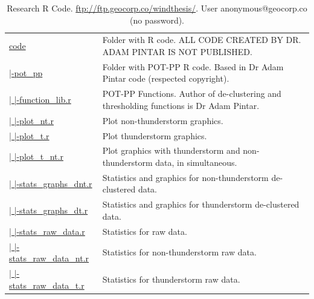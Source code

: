 \documentclass[12pt,twoside]{reedthesis}
\begin{document}
\begingroup\fontsize{7}{9}\selectfont
\begin{longtable}[t]{>{\raggedright\arraybackslash}p{1.3in}>{\raggedright\arraybackslash}p{4.9in}}
\caption[Research R Code]{\label{tab:code}Research R Code. \href{ftp://ftp.geocorp.co/windthesis/}{ftp://ftp.geocorp.co/windthesis/}. User anonymous@geocorp.co (no password).}\\
\toprule
\multicolumn{1}{l}{Folder Tree - Ftp Links} & \multicolumn{1}{l}{Description}\\
\midrule
\href{ftp://ftp.geocorp.co/windthesis/code/}{code} & Folder with R code. ALL CODE CREATED BY DR. ADAM PINTAR IS NOT PUBLISHED.\\
\href{ftp://ftp.geocorp.co/windthesis/code/pot_pp/}{  |-pot\_pp} & Folder with POT-PP R code. Based in Dr Adam Pintar code (respected copyright).\\
\href{ftp://ftp.geocorp.co/windthesis/code/pot_pp/function_lib.r}{  |    |-function\_lib.r} & POT-PP Functions. Author of de-clustering and thresholding functions is Dr Adam Pintar.\\
\href{ftp://ftp.geocorp.co/windthesis/code/pot_pp/plot_nt.r}{  |    |-plot\_nt.r} & Plot non-thunderstorm graphics.\\
\href{ftp://ftp.geocorp.co/windthesis/code/pot_pp/plot_t.r}{  |    |-plot\_t.r} & Plot thunderstorm graphics.\\
\href{ftp://ftp.geocorp.co/windthesis/code/pot_pp/plot_t_nt.r}{  |    |-plot\_t\_nt.r} & Plot graphics with thunderstorm and non-thunderstorm data, in simultaneous.\\
\href{ftp://ftp.geocorp.co/windthesis/code/pot_pp/statistics_and_graphics_declustered_nt.r}{  |    |-stats\_graphs\_dnt.r} & Statistics and graphics for non-thunderstorm de-clustered data.\\
\href{ftp://ftp.geocorp.co/windthesis/code/pot_pp/statistics_and_graphics_declustered_t.r}{  |    |-stats\_graphs\_dt.r} & Statistics and graphics for thunderstorm de-clustered data.\\
\href{ftp://ftp.geocorp.co/windthesis/code/pot_pp/statistics_raw_data.r}{  |    |-stats\_raw\_data.r} & Statistics for raw data.\\
\href{ftp://ftp.geocorp.co/windthesis/code/pot_pp/statistics_raw_data_nt.r}{  |    |-stats\_raw\_data\_nt.r} & Statistics for non-thunderstorm raw data.\\
\href{ftp://ftp.geocorp.co/windthesis/code/pot_pp/statistics_raw_data_t.r}{  |    |-stats\_raw\_data\_t.r} & Statistics for thunderstorm raw data.\\

\end{longtable}
\end{document}
